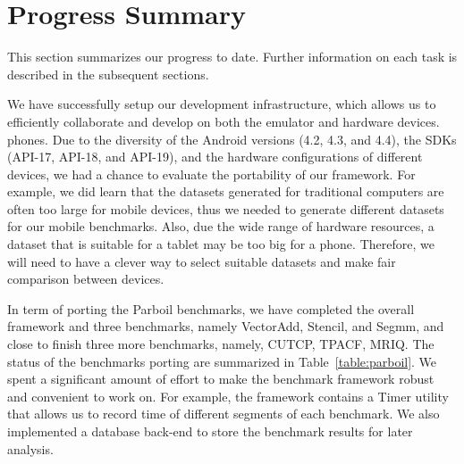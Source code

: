 
\section*{Progress Summary}

This section summarizes our progress to date. Further information on each task
is described in the subsequent sections.

We have successfully setup our development infrastructure, which allows us to
efficiently collaborate and develop on both the emulator and hardware devices.
phones.  Due to the diversity of the Android versions (4.2, 4.3, and 4.4), the
SDKs (API-17, API-18, and API-19), and the hardware configurations of different
devices, we had a chance to evaluate the portability of our framework. For
example, we did learn that the datasets generated for traditional computers are
often too large for mobile devices, thus we needed to generate different
datasets for our mobile benchmarks. Also, due the wide range of hardware
resources, a dataset that is suitable for a tablet may be too big for a phone.
Therefore, we will need to have a clever way to select suitable datasets and
make fair comparison between devices.

In term of porting the Parboil benchmarks, we have completed the overall
framework and three benchmarks, namely VectorAdd, Stencil, and Segmm, and close
to finish three more benchmarks, namely, CUTCP, TPACF, MRIQ. The status of the
benchmarks porting are summarized in Table~\ref{table:parboil}. We spent a
significant amount of effort to make the benchmark framework robust and
convenient to work on. For example, the framework contains a Timer utility that
allows us to record time of different segments of each benchmark. We also
implemented a database back-end to store the benchmark results for later
analysis.


